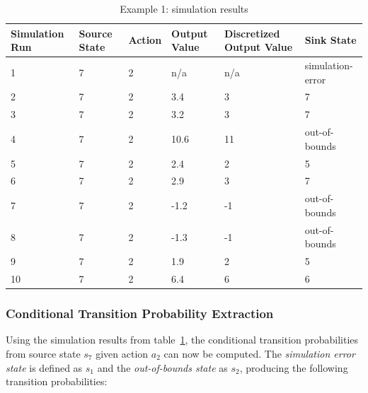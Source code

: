\begin{table}
\begin{center}
    \begin{tabular}{ | l | l | l | l | l | l |}
    \hline
    Simulation Run & Source State & Action & Output Value & Discretized Output Value & Sink State        \\ \hline
    1          & 7            & 2      & n/a          & n/a                      & simulation-error  \\ \hline
    2          & 7            & 2      & 3.4          & 3                        & 7                 \\ \hline
    3          & 7            & 2      & 3.2          & 3                        & 7                 \\ \hline
    4          & 7            & 2      & 10.6         & 11                       & out-of-bounds     \\ \hline
    5          & 7            & 2      & 2.4          & 2                        & 5                 \\ \hline
    6          & 7            & 2      & 2.9          & 3                        & 7                 \\ \hline
    7          & 7            & 2      & -1.2         & -1                       & out-of-bounds     \\ \hline
    8          & 7            & 2      & -1.3         & -1                       & out-of-bounds     \\ \hline
    9          & 7            & 2      & 1.9          & 2                        & 5                 \\ \hline
    10         & 7            & 2      & 6.4          & 6                        & 6                 \\ \hline

    \end{tabular}
\caption{Example 1: simulation results}
\label{exsimres}
\end{center}
\end{table}

\subsubsection{Conditional Transition Probability Extraction}

Using the simulation results from table~\ref{exsimres}, the conditional transition probabilities from source state $s_7$ given action $a_2$ can now be computed. The \textit{simulation error state} is defined as $s_1$ and the \textit{out-of-bounds state} as $s_2$, producing the following transition probabilities:

